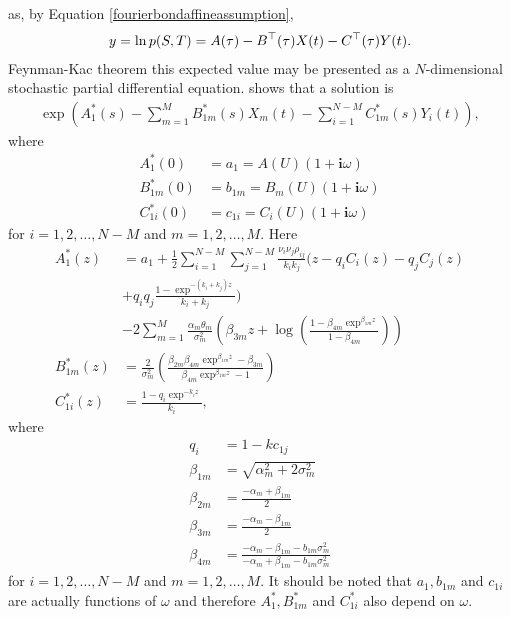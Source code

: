 as, by Equation \ref{fourierbondaffineassumption},
	\begin{align}
		y = \ln p(S,T) = A(\tau) - B^{\top} (\tau) X(t) - C^{\top} (\tau) Y(t) .
	\end{align}
Feynman-Kac theorem this expected value may be presented as a $N$-dimensional stochastic partial differential equation. \textcite{nawalkabeliaevasoto2007dynamic} shows that a solution is
\begin{align}
\exp \left( A_1^*(s) - \sum_{m=1}^M B_{1m}^*(s) X_m(t) - \sum_{i=1}^{N-M} C_{1m}^*(s) Y_i(t) \right) ,
\end{align}
where
\begin{align}
A_1^*(0) &= a_1 = A(U) ( 1+\boldsymbol{i} \omega ) \\ 
B_{1m}^*(0) &= b_{1m} = B_m(U) ( 1+\boldsymbol{i} \omega ) \\ 
C_{1i}^*(0) &= c_{1i} = C_i(U) ( 1+\boldsymbol{i} \omega )
\end{align}
for $i= 1,2, \ldots, N-M$ and $m=1,2, \ldots , M$. Here
\begin{align}
A_1^*(z) &= a_1  +  \frac{1}{2} \sum_{i=1}^{N-M} \sum_{j=1}^{N-M} \frac{\nu_i \nu_j \rho_{ij}}{k_ik_j} ( z - q_i C_i(z) - q_j C_j(z) \\ &+ q_iq_j \frac{1 - \exp^{ - (k_i+k_j)z } }{k_i+k_j} ) \\
&- 2 \sum_{m=1}^M \frac{\alpha_m \theta_m}{\sigma_m^2} \left( \beta_{3m} z + \log ( \frac{1 - \beta_ {4m} \exp^{ \beta_{1m} z } }{1 - \beta_{4m}} )  \right) \\
B_{1m}^*(z) &= \frac{2}{\sigma_m^2} \left( \frac{ \beta_{2m} \beta_{4m} \exp^{\beta_{1m} z} - \beta_{3m} }{ \beta_{4m} \exp^{\beta_{1m} z} - 1 } \right) \\
C_{1i}^* (z) &= \frac{1-q_i \exp^{-k_iz}}{k_i},
\end{align}
where
\begin{align}
q_i &= 1 - k c_{1j} \\
\beta_{1m} &= \sqrt{\alpha_m^2 + 2 \sigma_m^2} \\
\beta_{2m} &= \frac{- \alpha_m + \beta_{1m}}{2} \\
\beta_{3m} &= \frac{- \alpha_m - \beta_{1m}}{2} \\
\beta_{4m} &= \frac{ - \alpha_m - \beta_{1m} - b_{1m} \sigma_m^2 }{ - \alpha_m + \beta_{1m} - b_{1m} \sigma_m^2 }
\end{align}
for $i= 1,2, \ldots, N-M$ and $m=1,2, \ldots , M$. It should be noted that $a_1, b_{1m}$ and $c_{1i}$ are actually functions of $\omega$ and therefore $A_1^*, B_{1m}^*$ and $C_{1i}^*$ also depend on $\omega$.

